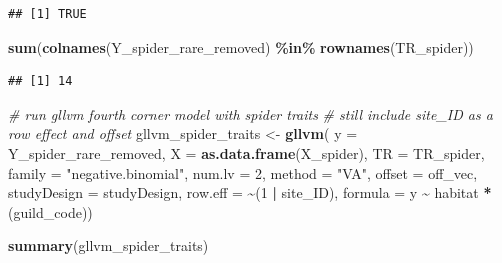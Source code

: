 \documentclass[
]{article}
\newenvironment{Shaded}{\begin{snugshade}}{\end{snugshade}}
\newcommand{\AttributeTok}[1]{\textcolor[rgb]{0.13,0.29,0.53}{#1}}
\newcommand{\CommentTok}[1]{\textcolor[rgb]{0.56,0.35,0.01}{\textit{#1}}}
\newcommand{\DecValTok}[1]{\textcolor[rgb]{0.00,0.00,0.81}{#1}}
\newcommand{\FunctionTok}[1]{\textcolor[rgb]{0.13,0.29,0.53}{\textbf{#1}}}
\newcommand{\NormalTok}[1]{#1}
\newcommand{\OtherTok}[1]{\textcolor[rgb]{0.56,0.35,0.01}{#1}}
\newcommand{\SpecialCharTok}[1]{\textcolor[rgb]{0.81,0.36,0.00}{\textbf{#1}}}
\newcommand{\StringTok}[1]{\textcolor[rgb]{0.31,0.60,0.02}{#1}}
\begin{document}
\begin{verbatim}
## [1] TRUE
\end{verbatim}

\begin{Shaded}
\begin{Highlighting}[]
\FunctionTok{sum}\NormalTok{(}\FunctionTok{colnames}\NormalTok{(Y\_spider\_rare\_removed) }\SpecialCharTok{\%in\%} \FunctionTok{rownames}\NormalTok{(TR\_spider))}
\end{Highlighting}
\end{Shaded}

\begin{verbatim}
## [1] 14
\end{verbatim}

\begin{Shaded}
\end{Shaded}

\begin{Shaded}
\begin{Highlighting}[]
\CommentTok{\# run gllvm fourth corner model with spider traits}
\CommentTok{\# still include site\_ID as a row effect and offset}
\NormalTok{gllvm\_spider\_traits }\OtherTok{\textless{}{-}} \FunctionTok{gllvm}\NormalTok{(}
  \AttributeTok{y =}\NormalTok{ Y\_spider\_rare\_removed,}
  \AttributeTok{X =} \FunctionTok{as.data.frame}\NormalTok{(X\_spider),}
  \AttributeTok{TR =}\NormalTok{ TR\_spider,}
  \AttributeTok{family =} \StringTok{"negative.binomial"}\NormalTok{,}
  \AttributeTok{num.lv =} \DecValTok{2}\NormalTok{,}
  \AttributeTok{method =} \StringTok{"VA"}\NormalTok{,}
  \AttributeTok{offset =}\NormalTok{ off\_vec,}
  \AttributeTok{studyDesign =}\NormalTok{ studyDesign,}
  \AttributeTok{row.eff =} \SpecialCharTok{\textasciitilde{}}\NormalTok{(}\DecValTok{1} \SpecialCharTok{|}\NormalTok{ site\_ID),}
  \AttributeTok{formula =}\NormalTok{ y }\SpecialCharTok{\textasciitilde{}}\NormalTok{ habitat }\SpecialCharTok{*}\NormalTok{ (guild\_code))}

\FunctionTok{summary}\NormalTok{(gllvm\_spider\_traits)}
\end{Highlighting}
\end{Shaded}
\end{document}
